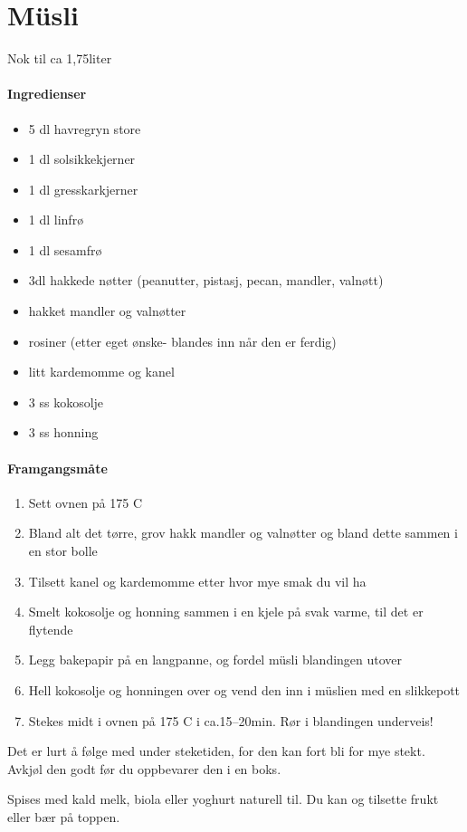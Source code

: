 \section{﻿Müsli}
Nok til ca 1,75liter

\paragraph{Ingredienser}
\begin{itemize}[noitemsep]
	\item 5 dl havregryn store
	\item 1 dl solsikkekjerner
	\item 1 dl gresskarkjerner
	\item 1 dl linfrø
	\item 1 dl sesamfrø
	\item 3dl hakkede nøtter (peanutter, pistasj, pecan, mandler, valnøtt)
	\item hakket mandler og valnøtter
	\item rosiner (etter eget ønske- blandes inn når den er ferdig)
	\item litt kardemomme og kanel
	\item 3 ss kokosolje
	\item 3 ss honning
\end{itemize}

\paragraph{Framgangsmåte}
\begin{enumerate}[noitemsep]
	\item	Sett ovnen på 175 \degree C
	\item	Bland alt det tørre, grov hakk mandler og valnøtter og bland dette sammen i en stor bolle
	\item	Tilsett kanel og kardemomme etter hvor mye smak du vil ha
	\item	Smelt kokosolje og honning sammen i en kjele på svak varme, til det er flytende
	\item	Legg bakepapir på en langpanne, og fordel müsli blandingen utover
	\item	Hell kokosolje og honningen over og vend den inn i müslien med en slikkepott
	\item	Stekes midt i ovnen på 175 \degree C i ca.15--20min. Rør i blandingen underveis!
\end{enumerate}


Det er lurt å følge med under steketiden, for den kan fort bli for mye stekt.
Avkjøl den godt før du oppbevarer den i en boks.

Spises med kald melk, biola eller yoghurt naturell til. Du kan og tilsette frukt eller bær på toppen.

